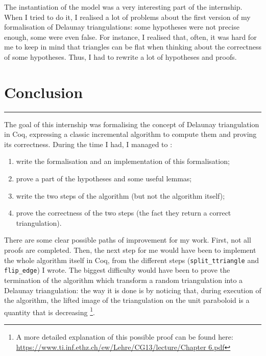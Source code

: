 \documentclass[a4paper,10pt]{article}
\begin{document}
  The instantiation of the model was a very interesting part of the internship. When I tried to do it, I realised a lot of problems about the first version of my formalisation of Delaunay triangulations: some hypotheses were not precise enough, some were even false. For instance, I realised that, often, it was hard for me to keep in mind that triangles can be flat when thinking about the correctness of some hypotheses. Thus, I had to rewrite a lot of hypotheses and proofs.


\newpage
\section{Conclusion}
\rule{\linewidth}{0.5pt}
The goal of this internship was formalising the concept of Delaunay triangulation in {\sc Coq}, expressing a classic incremental algorithm to compute them and proving its correctness. During the time I had, I managed to :
\begin{enumerate}
\item write the formalisation and an implementation of this formalisation;
\item prove a part of the hypotheses and some useful lemmas;
\item write the two steps of the algorithm (but not the algorithm itself);
\item prove the correctness of the two steps (the fact they return a correct triangulation).
\end{enumerate}

There are some clear possible paths of improvement for my work. First, not all proofs are completed. Then, the next step for me would have been to implement the whole algorithm itself in {\sc Coq}, from the different steps ({\tt split\_ttriangle} and {\tt flip\_edge}) I wrote. The biggest difficulty would have been to prove the termination of the algorithm which transform a random triangulation into a Delaunay triangulation: the way it is done is by noticing that, during execution of the algorithm, the lifted image of the triangulation on the unit paraboloid is a quantity that is decreasing \footnote{A more detailed explanation of this possible proof can be found here:
\href{https://www.ti.inf.ethz.ch/ew/Lehre/CG13/lecture/Chapter 6.pdf}{https://www.ti.inf.ethz.ch/ew/Lehre/CG13/lecture/Chapter 6.pdf}}.
\end{document}
